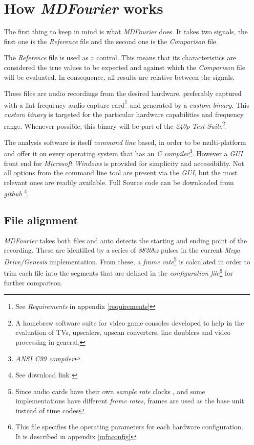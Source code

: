 \documentclass[10pt,a4paper]{report}
\begin{document}
\chapter{How \textit{MDFourier} works}
\label{howitworks}

The first thing to keep in mind is what \textit{MDFourier} does. It takes two signals, the first one is the \textit{Reference} file and the second one is the \textit{Comparison} file.

The \textit{Reference} file is used as a control. This means that its characteristics are considered the true values to be expected and against which the \textit{Comparison} file will be evaluated. In consequence, all results are relative between the signals.

These files are audio recordings from the desired hardware, preferably captured with a flat frequency audio capture card\footnote{See \textit{Requirements} in appendix \ref{requirements}} and generated by a \textit{custom binary}. This \textit{custom binary} is targeted for the particular hardware capabilities and frequency range. Whenever possible, this binary will be part of the \textit{240p Test Suite}\footnote{A homebrew software suite for video game consoles developed to help in the evaluation of TVs, upscalers, upscan converters, line doublers and video processing in general.\cite{240pSuite}}. 

The analysis software is itself \textit{command line} based, in order to be multi-platform and offer it on every operating system that has an \textit{C compiler}\footnote{\textit{ANSI C99 compiler}}. However a \textit{GUI} front end for \textit{Microsoft Windows} is provided for simplicity and accessibility. Not all options from the command line tool are present via the \textit{GUI}, but the most relevant ones are readily available. Full Source code can be downloaded from \textit{github} \footnote{See download link \cite{sourcecode}}.

\section{File alignment}

\textit{MDFourier} takes both files and auto detects the starting and ending point of the recording. These are identified by a series of \textit{8820hz} pulses in the current \textit{Mega Drive/Genesis} implementation. From these, a \textit{frame rate}\footnote{Since audio cards have their own \textit{sample rate} clocks \cite{SoundCardClock} \cite{soundcardtiming} \cite{gwsoundcardtiming}, and some implementations have different \textit{frame rates}, frames are used as the base unit instead of time codes} is calculated in order to trim each file into the segments that are defined in the \textit{configuration file}\footnote{This file specifies the operating parameters for each hardware configuration. It is described in appendix \ref{mfnconfig}} for further comparison.
\end{document}
